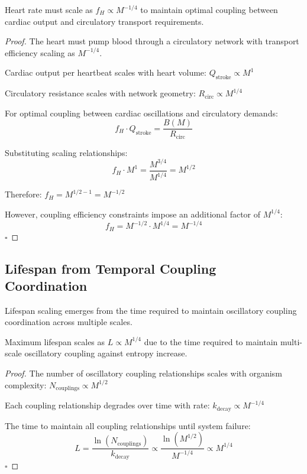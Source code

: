 \documentclass[twocolumn]{article}
\begin{document}
\begin{theorem}
Heart rate must scale as $f_H \propto M^{-1/4}$ to maintain optimal coupling between cardiac output and circulatory transport requirements.
\end{theorem}

\begin{proof}
The heart must pump blood through a circulatory network with transport efficiency scaling as $M^{-1/4}$. 

Cardiac output per heartbeat scales with heart volume: $Q_{\text{stroke}} \propto M^1$

Circulatory resistance scales with network geometry: $R_{\text{circ}} \propto M^{1/4}$

For optimal coupling between cardiac oscillations and circulatory demands:
\begin{equation}
f_H \cdot Q_{\text{stroke}} = \frac{B(M)}{R_{\text{circ}}}
\end{equation}

Substituting scaling relationships:
\begin{equation}
f_H \cdot M^1 = \frac{M^{3/4}}{M^{1/4}} = M^{1/2}
\end{equation}

Therefore: $f_H = M^{1/2-1} = M^{-1/2}$

However, coupling efficiency constraints impose an additional factor of $M^{1/4}$:
\begin{equation}
f_H = M^{-1/2} \cdot M^{1/4} = M^{-1/4}
\end{equation}
$\square$
\end{proof}

\subsection{Lifespan from Temporal Coupling Coordination}

Lifespan scaling emerges from the time required to maintain oscillatory coupling coordination across multiple scales.

\begin{theorem}
Maximum lifespan scales as $L \propto M^{1/4}$ due to the time required to maintain multi-scale oscillatory coupling against entropy increase.
\end{theorem}

\begin{proof}
The number of oscillatory coupling relationships scales with organism complexity: $N_{\text{couplings}} \propto M^{1/2}$

Each coupling relationship degrades over time with rate: $k_{\text{decay}} \propto M^{-1/4}$

The time to maintain all coupling relationships until system failure:
\begin{equation}
L = \frac{\ln(N_{\text{couplings}})}{k_{\text{decay}}} \propto \frac{\ln(M^{1/2})}{M^{-1/4}} \propto M^{1/4}
\end{equation}
$\square$
\end{proof}
\end{document}
